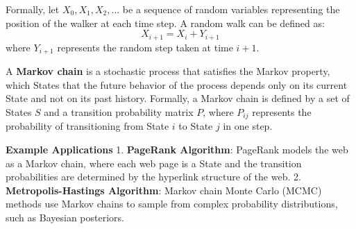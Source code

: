 \documentclass[12pt]{book} %
\begin{document}
Formally, let \(X_0, X_1, X_2, \ldots\) be a sequence of random variables representing the position of the walker at each time step. A random walk can be defined as:
\[ X_{i+1} = X_i + Y_{i+1} \]
where \(Y_{i+1}\) represents the random step taken at time \(i+1\).

A \textbf{Markov chain} is a stochastic process that satisfies the Markov property, which States that the future behavior of the process depends only on its current State and not on its past history. Formally, a Markov chain is defined by a set of States \(S\) and a transition probability matrix \(P\), where \(P_{ij}\) represents the probability of transitioning from State \(i\) to State \(j\) in one step.

\textbf{Example Applications}
1. \textbf{PageRank Algorithm}: PageRank models the web as a Markov chain, where each web page is a State and the transition probabilities are determined by the hyperlink structure of the web.
2. \textbf{Metropolis-Hastings Algorithm}: Markov chain Monte Carlo (MCMC) methods use Markov chains to sample from complex probability distributions, such as Bayesian posteriors.
\end{document}
